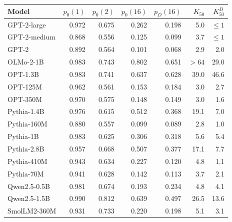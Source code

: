 \begin{tabular}{@{}lrrrrrr@{}}
\toprule
Model & $p_0(1)$ & $p_0(2)$ & $p_0(16)$ & $p_D(16)$ & $K_{50}$ & $K_{50}^{D}$ \\
\midrule
GPT-2-large & 0.972 & 0.675 & 0.262 & 0.198 & 5.0 & $\leq 1$ \\
GPT-2-medium & 0.868 & 0.556 & 0.125 & 0.099 & 3.7 & $\leq 1$ \\
GPT-2 & 0.892 & 0.564 & 0.101 & 0.068 & 2.9 & 2.0 \\
OLMo-2-1B & 0.983 & 0.743 & 0.802 & 0.651 & $>64$ & 29.0 \\
OPT-1.3B & 0.983 & 0.741 & 0.637 & 0.628 & 39.0 & 46.6 \\
OPT-125M & 0.962 & 0.561 & 0.153 & 0.184 & 3.0 & 2.7 \\
OPT-350M & 0.970 & 0.575 & 0.148 & 0.149 & 3.0 & 1.6 \\
Pythia-1.4B & 0.976 & 0.615 & 0.512 & 0.368 & 19.1 & 7.0 \\
Pythia-160M & 0.880 & 0.557 & 0.099 & 0.089 & 2.8 & 1.0 \\
Pythia-1B & 0.983 & 0.625 & 0.306 & 0.318 & 5.6 & 5.4 \\
Pythia-2.8B & 0.957 & 0.668 & 0.507 & 0.377 & 17.1 & 7.7 \\
Pythia-410M & 0.943 & 0.634 & 0.227 & 0.120 & 4.8 & 1.1 \\
Pythia-70M & 0.941 & 0.628 & 0.142 & 0.113 & 3.7 & 2.1 \\
Qwen2.5-0.5B & 0.981 & 0.674 & 0.193 & 0.234 & 4.8 & 4.1 \\
Qwen2.5-1.5B & 0.990 & 0.812 & 0.639 & 0.497 & 26.5 & 13.6 \\
SmolLM2-360M & 0.931 & 0.733 & 0.220 & 0.198 & 5.1 & 3.1 \\
\bottomrule
\end{tabular}
